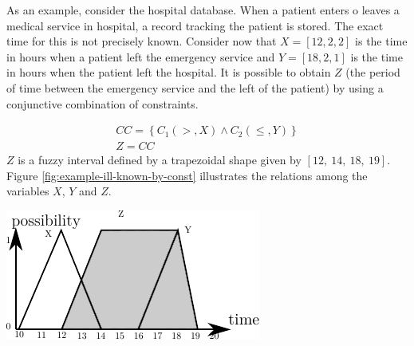 \begin{example}
As an example, consider the hospital database. When a patient enters o leaves a medical service in hospital, a record tracking the patient is stored. The exact time for this is not precisely known. Consider now that $X = \left[12, 2, 2\right]$ is the time in hours when a patient left the emergency service and $Y = \left[18, 2, 1 \right]$ is the time in hours when the patient left the hospital. It is possible to obtain $Z$ (the period of time between the emergency service and the left of the patient) by using a conjunctive combination of constraints.

\begin{align}
\nonumber
CC = \left \lbrace C_1\left(>,X\right) \wedge C_2(\leq,Y) \right \rbrace \\
\nonumber
Z = CC
\end{align}
$Z$ is a fuzzy interval defined by a trapezoidal shape given by $\left[12,\ 14,\ 18,\ 19 \right]$.
Figure \ref{fig:example-ill-known-by-const} illustrates the relations among the variables $X$, $Y$ and $Z$.
\end{example}

\vspace*{13pt}
\begin{center}
{
\includegraphics[scale=1]{./graphs/ill-known-by-constraints.pdf}

}
\end{center}
\vspace*{10pt}
\vspace*{13pt}

